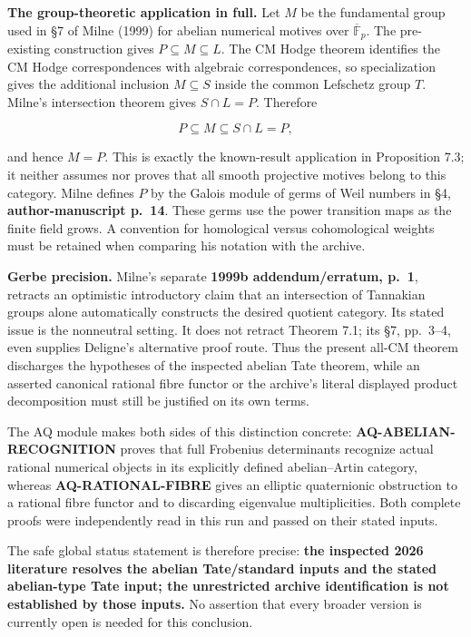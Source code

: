 \documentclass[11pt,a4paper]{article}
\theoremstyle{definition}\newtheorem{definition}[theorem]{Definition}
\theoremstyle{remark}\newtheorem{remark}[theorem]{Remark}
\begin{document}
\textbf{The group-theoretic application in full.} Let \(M\) be the
fundamental group used in §7 of Milne (1999) for abelian numerical
motives over \(\overline{\mathbb F}_p\). The pre-existing construction
gives \(P\subseteq M\subseteq L\). The CM Hodge theorem identifies the
CM Hodge correspondences with algebraic correspondences, so
specialization gives the additional inclusion \(M\subseteq S\) inside
the common Lefschetz group \(T\). Milne's intersection theorem gives
\(S\cap L=P\). Therefore

\[
P\subseteq M\subseteq S\cap L=P,
\]

and hence \(M=P\). This is exactly the known-result application in
Proposition 7.3; it neither assumes nor proves that all smooth
projective motives belong to this category. Milne defines \(P\) by the
Galois module of germs of Weil numbers in §4, \textbf{author-manuscript
p.~14}. These germs use the power transition maps as the finite field
grows. A convention for homological versus cohomological weights must be
retained when comparing his notation with the archive.

\textbf{Gerbe precision.} Milne's separate \textbf{1999b
addendum/erratum, p.~1}, retracts an optimistic introductory claim that
an intersection of Tannakian groups alone automatically constructs the
desired quotient category. Its stated issue is the nonneutral setting.
It does not retract Theorem 7.1; its §7, pp.~3--4, even supplies
Deligne's alternative proof route. Thus the present all-CM theorem
discharges the hypotheses of the inspected abelian Tate theorem, while
an asserted canonical rational fibre functor or the archive's literal
displayed product decomposition must still be justified on its own
terms.

The AQ module makes both sides of this distinction concrete:
\textbf{AQ-ABELIAN-RECOGNITION} proves that full Frobenius determinants
recognize actual rational numerical objects in its explicitly defined
abelian--Artin category, whereas \textbf{AQ-RATIONAL-FIBRE} gives an
elliptic quaternionic obstruction to a rational fibre functor and to
discarding eigenvalue multiplicities. Both complete proofs were
independently read in this run and passed on their stated inputs.

The safe global status statement is therefore precise: \textbf{the
inspected 2026 literature resolves the abelian Tate/standard inputs and
the stated abelian-type Tate input; the unrestricted archive
identification is not established by those inputs.} No assertion that
every broader version is currently open is needed for this conclusion.
\end{document}
